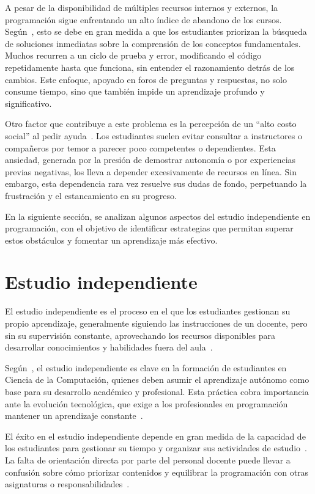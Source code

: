 \documentclass{article}
\begin{document}
A pesar de la disponibilidad de múltiples recursos internos y externos, la programación sigue enfrentando un alto índice de abandono de los cursos. Según~\cite{wong2022}, esto se debe en gran medida a que los estudiantes priorizan la búsqueda de soluciones inmediatas sobre la comprensión de los conceptos fundamentales. Muchos recurren a un ciclo de prueba y error, modificando el código repetidamente hasta que funciona, sin entender el razonamiento detrás de los cambios. Este enfoque, apoyado en foros de preguntas y respuestas, no solo consume tiempo, sino que también impide un aprendizaje profundo y significativo.

Otro factor que contribuye a este problema es la percepción de un ``alto costo social'' al pedir ayuda~\cite{wong2022}. Los estudiantes suelen evitar consultar a instructores o compañeros por temor a parecer poco competentes o dependientes. Esta ansiedad, generada por la presión de demostrar autonomía o por experiencias previas negativas, los lleva a depender excesivamente de recursos en línea. Sin embargo, esta dependencia rara vez resuelve sus dudas de fondo, perpetuando la frustración y el estancamiento en su progreso.

En la siguiente sección, se analizan algunos aspectos del estudio independiente en programación, con el objetivo de identificar estrategias que permitan superar estos obstáculos y fomentar un aprendizaje más efectivo.

\section{Estudio independiente}\label{sec:study}

El estudio independiente es el proceso en el que los estudiantes gestionan su propio aprendizaje, generalmente siguiendo las instrucciones de un docente, pero sin su supervisión constante, aprovechando los recursos disponibles para desarrollar conocimientos y habilidades fuera del aula~\cite{proskuraLytvynova2020}.

Según~\cite{proskuraLytvynova2020}, el estudio independiente es clave en la formación de estudiantes en Ciencia de la Computación, quienes deben asumir el aprendizaje autónomo como base para su desarrollo académico y profesional. Esta práctica cobra importancia ante la evolución tecnológica, que exige a los profesionales en programación mantener un aprendizaje constante~\cite{proskuraLytvynova2020}.

El éxito en el estudio independiente depende en gran medida de la capacidad de los estudiantes para gestionar su tiempo y organizar sus actividades de estudio~\cite{overklift2019}. La falta de orientación directa por parte del personal docente puede llevar a confusión sobre cómo priorizar contenidos y equilibrar la programación con otras asignaturas o responsabilidades~\cite{proskuraLytvynova2020}. 
\end{document}
